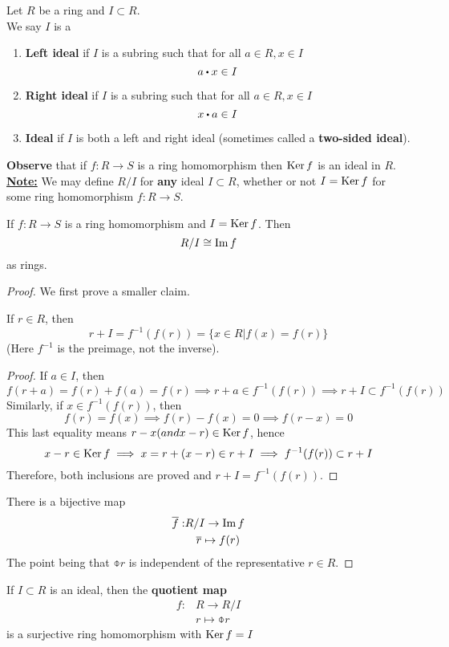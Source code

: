 \documentclass[../Main.tex]{subfiles}
\begin{document}
\begin{dfn}[title=Ideal]
	Let $R$ be a ring and $I\subset R$.\\
	We say $I$ is a 
	\begin{enumerate}[label=(\roman*)]
		\item \textbf{Left ideal} if $I$ is a subring such that for all $a\in R, x\in I$
		\[a\rdot x \in I\]
		\item \textbf{Right ideal} if $I$ is a subring such that for all $a\in R, x\in I$
		\[x\rdot a \in I\]
		\item \textbf{Ideal} if $I$ is both a left and right ideal (sometimes called a \textbf{two-sided ideal}).
	\end{enumerate}
\end{dfn}
\textbf{Observe} that if $f:R\to S$ is a ring homomorphism then $\operatorname{Ker} f$ is an ideal in $R$.\\
\underline{\textbf{Note:}} We may define $R/I$ for \textbf{any} ideal $I\subset R$, whether or not $I=\operatorname{Ker} f$ for some ring homomorphism $f:R\to S$.
\newpage
\begin{thm}[title = The First Isomorphism Theorem]
	If $f:R\to S$ is a ring homomorphism and $I=\operatorname{Ker} f$. Then
	\[R/I\cong \operatorname{Im} f\]
	as rings.
\end{thm}
\begin{proof}
	We first prove a smaller claim.
	\begin{claim}
		If $r \in R$, then  \[r+I = f^{-1}(f(r)) =\{x\in R|f(x)=f(r)\}\]
	(Here $f^{-1}$ is the preimage, not the inverse).
	\end{claim}
	\begin{proof}
		If $a\in I$, then 
		\[f(r+a)=f(r)+f(a)=f(r) \implies r+a \in f^{-1}(f(r)) \implies r+I \subset f^{-1}(f(r))\]
		Similarly, if $x\in f^{-1}(f(r))$, then
		\[f(r)=f(x)\implies f(r)-f(x)=0\implies f(r-x)=0\]
		This last equality means $r-x (and x-r) \in \operatorname{Ker} f$, hence
		\[x-r\in \operatorname{Ker} f \implies x = r+(x-r)\in r+I \implies
		f^{-1}(f(r)) \subset r+I \]
		Therefore, both inclusions are proved and $r+I =f^{-1}(f(r))$.
	\end{proof}
	There is a bijective map
	\begin{align*}
		\overline{f}:& R/I \to \operatorname{Im} f \\
		&\quad \overline{r} \mapsto f(r)
	\end{align*}
	The point being that $\obar{r}$ is independent of the representative $r\in R$.
\end{proof}
\begin{thm}
	If $I\subset R$ is an ideal, then the \textbf{quotient map}
	\begin{align*}
		f:&R \to R/I\\
		&r\mapsto \obar{r}
	\end{align*}
	is a surjective ring homomorphism with $\operatorname{Ker} f = I$
\end{thm}
\end{document}
